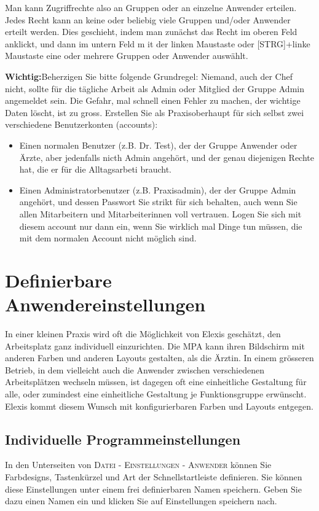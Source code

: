 Man kann Zugriffrechte also an Gruppen oder an einzelne Anwender erteilen. Jedes
Recht kann an keine oder beliebig viele Gruppen und/oder Anwender erteilt
werden. Dies geschieht, indem man zunächst das Recht im oberen Feld anklickt,
und dann im untern Feld m it der linken Maustaste oder [STRG]+linke Maustaste
eine oder mehrere Gruppen oder Anwender auswählt.

\textbf{Wichtig:}Beherzigen Sie bitte folgende Grundregel: Niemand, auch der
Chef nicht, sollte für die tägliche Arbeit als Admin oder Mitglied der Gruppe
Admin angemeldet sein. Die Gefahr, mal schnell einen Fehler zu machen, der
wichtige Daten löscht, ist zu gross. Erstellen Sie als Praxisoberhaupt für sich
selbst zwei verschiedene Benutzerkonten (accounts):
\begin{itemize}
  \item Einen normalen Benutzer (z.B. Dr. Test), der der Gruppe Anwender oder
  Ärzte, aber jedenfalls nicth Admin angehört, und der genau diejenigen Rechte
  hat, die er für die Alltagsarbeti braucht.
  \item Einen Administratorbenutzer (z.B. Praxisadmin), der der Gruppe Admin
  angehört, und dessen Passwort Sie strikt für sich behalten, auch wenn Sie
  allen Mitarbeitern und Mitarbeiterinnen voll vertrauen. Logen Sie sich mit
  diesem account nur dann ein, wenn Sie wirklich mal Dinge tun müssen, die mit
  dem normalen Account nicht möglich sind.
\end{itemize}

\section{Definierbare Anwendereinstellungen}
In einer kleinen Praxis wird oft die Möglichkeit von Elexis geschätzt, den
Arbeitsplatz ganz individuell einzurichten. Die MPA kann ihren Bildschirm mit
anderen Farben und anderen Layouts gestalten, als die Ärztin.
In einem grösseren Betrieb, in dem vielleicht auch die Anwender zwischen
verschiedenen Arbeitsplätzen wechseln müssen, ist dagegen oft eine einheitliche
Gestaltung für alle, oder zumindest eine einheitliche Gestaltung je
Funktionsgruppe erwünscht. Elexis kommt diesem Wunsch mit konfigurierbaren
Farben und Layouts entgegen.

\subsection{Individuelle Programmeinstellungen}
In den Unterseiten von \textsc{Datei - Einstellungen - Anwender} können Sie
Farbdesigns, Tastenkürzel und Art der Schnellstartleiste definieren. Sie können
diese Einstellungen unter einem frei definierbaren Namen speichern. Geben Sie
dazu einen Namen ein und klicken Sie auf \glqq Einstellungen speichern
nach\grqq{}. 

